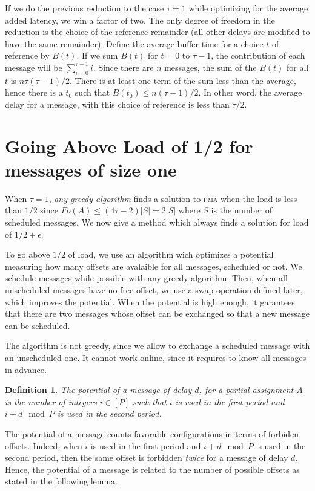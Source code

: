 \documentclass[10pt, conference, letterpaper]{IEEEtran}
\newtheorem{definition}{Definition}
\newcommand\pma{\textsc{pma}\xspace}
\begin{document}
If we do the previous reduction to the case $\tau=1$ while optimizing for the average added latency, we win a factor of two. The only degree of freedom in the reduction is the choice of the reference remainder (all other delays are modified to have the same remainder).
Define the average buffer time for a choice $t$ of reference by $B(t)$. 
If we sum $B(t)$ for $t=0$ to $\tau-1$, the contribution of each message 
will be $\sum_{i=0}^{\tau-1} i$. Since there are $n$ messages, the sum of the $B(t)$ for all $t$ is $n \tau (\tau-1)/2$. There is at least one term of the sum less than the average,
hence there is a $t_0$ such that $B(t_0) \leq n (\tau-1)/2$. In other word, the average
delay for a message, with this choice of reference is less than $\tau/2$.


\section{Going Above Load of 1/2 for messages of size one}

When $\tau = 1$, \emph{any greedy algorithm} finds a solution to \pma when the load is less than $1/2$ since $Fo(A) \leq (4\tau -2)|S| = 2|S|$ where $S$ is the number of scheduled messages. We now give a method which always finds a solution for load of $1/2 + \epsilon$.

To go above $1/2$ of load, we use an algorithm wich optimizes a potential measuring how many offsets 
are avalaible for all messages, scheduled or not. We schedule messages while possible with any greedy algorithm.
Then, when all unscheduled messages have no free offset, we use a swap operation defined later, 
which improves the potential. When the potential is high enough, it garantees that there are two messages whose offset can be exchanged so that a new message can be scheduled. 

 The algorithm is not greedy, since we allow to exchange a scheduled message with an unscheduled one. It cannot work online, since it requires to know all messages in advance. 

\begin{definition}
The potential of a message of delay $d$, for a partial assignment $A$
is the number of integers $i \in [P]$ such that $i$ is used in the first period and $i+d \mod P$ is used in the second period.
\end{definition}

The potential of a message counts favorable configurations in terms of forbiden offsets.
Indeed, when $i$ is used in the first period and $i+d \mod P$ is used in the second period,
then the same offset is forbidden \emph{twice} for a message of delay $d$. Hence, the potential 
of a message is related to the number of possible offsets as stated in the following lemma. 
\end{document}
